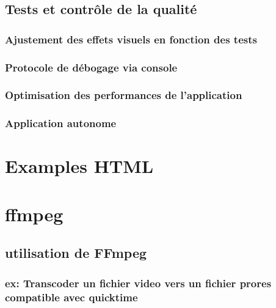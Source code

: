 \documentclass[
]{book}
\begin{document}
\hypertarget{tests-et-contruxf4le-de-la-qualituxe9}{%
\section{Tests et contrôle de la qualité}\label{tests-et-contruxf4le-de-la-qualituxe9}}

\hypertarget{ajustement-des-effets-visuels-en-fonction-des-tests}{%
\subsection{Ajustement des effets visuels en fonction des tests}\label{ajustement-des-effets-visuels-en-fonction-des-tests}}

\hypertarget{protocole-de-duxe9bogage-via-console}{%
\subsection{Protocole de débogage via console}\label{protocole-de-duxe9bogage-via-console}}

\hypertarget{optimisation-des-performances-de-lapplication}{%
\subsection{Optimisation des performances de l'application}\label{optimisation-des-performances-de-lapplication}}

\hypertarget{application-autonome}{%
\subsection{Application autonome}\label{application-autonome}}

\hypertarget{examples-html}{%
\chapter{Examples HTML}\label{examples-html}}

\hypertarget{ffmpeg}{%
\chapter{ffmpeg}\label{ffmpeg}}

\hypertarget{utilisation-de-ffmpeg}{%
\section{utilisation de FFmpeg}\label{utilisation-de-ffmpeg}}

\hypertarget{ex-transcoder-un-fichier-video-vers-un-fichier-prores-compatible-avec-quicktime}{%
\subsection{ex: Transcoder un fichier video vers un fichier prores compatible avec quicktime}\label{ex-transcoder-un-fichier-video-vers-un-fichier-prores-compatible-avec-quicktime}}
\end{document}
